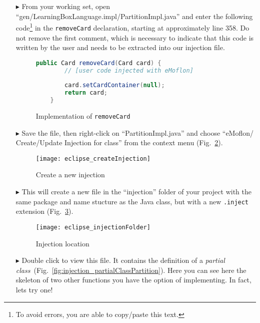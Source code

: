 \begin{itemize}


\item[$\blacktriangleright$] From your working set, open ``gen/LearningBoxLanguage.impl/PartitionImpl.java'' and enter the following code\footnote{To avoid
errors, you are able to copy/paste this text.} in the \texttt{removeCard} declaration, starting at approximately line 358. Do not remove the first comment,
which is necessary to indicate that this code is written by the user and needs to be extracted into our injection file.

\begin{figure}[htbp]
        \centering
        \begin{lstlisting}[language=Java, keywordstyle={\bfseries\color{purple}}, backgroundcolor=\color{white}]
    public Card removeCard(Card card) {
        // [user code injected with eMoflon]
        
        card.setCardContainer(null);
        return card;
    }
        \end{lstlisting}
        \caption{Implementation of \texttt{removeCard}}
        \label{fig:addToStringRep_impl}
\end{figure}

\item[$\blacktriangleright$] Save the file, then right-click on ``PartitionImpl.java'' and choose ``eMoflon/ Create/Update Injection for class'' from the
context menu (Fig.~\ref{fig:injection_create_injection}).

\begin{figure}[htbp]
    \centering
    \texttt{[image: eclipse\_createInjection]}
    \caption{Create a new injection}
    \label{fig:injection_create_injection}
\end{figure}
    
\item[$\blacktriangleright$] This will create a new file in the ``injection'' folder of your project with the same package and name stucture as the Java class,
but with a new \texttt{.inject} extension (Fig.~\ref{fig:injection_folder}).

\begin{figure}[htbp]
    \centering
    \texttt{[image: eclipse\_injectionFolder]}
    \caption{Injection location}
    \label{fig:injection_folder}
\end{figure}

\item[$\blacktriangleright$] Double click to view this file. It contains the definition of a \textit{partial
class}~(Fig.~\ref{fig:injection_partialClassPartition}).
Here you can see here the skeleton of two other functions you have the option of implementing. In fact, lets try one!


\end{itemize}
